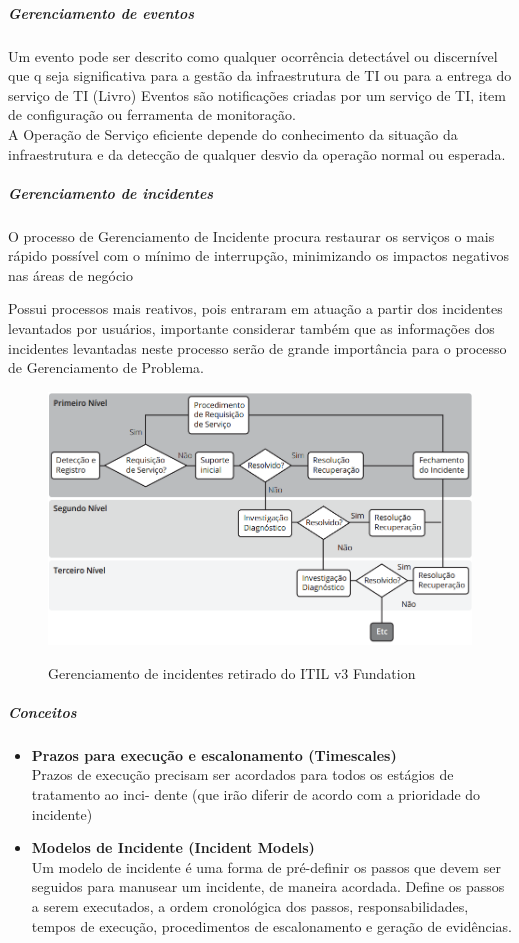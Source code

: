 \subparagraph{Gerenciamento de eventos}
Um evento pode ser descrito como qualquer ocorrência detectável ou discernível que q
seja significativa para a gestão da infraestrutura de TI ou para a entrega do serviço de TI (Livro)
Eventos são notificações criadas por um serviço de TI, item de configuração ou ferramenta
de monitoração.\\ A Operação de Serviço eficiente depende do conhecimento da situação
da infraestrutura e da detecção de qualquer desvio da operação normal ou esperada.


\subparagraph{Gerenciamento de incidentes}
O processo de Gerenciamento de Incidente procura restaurar os serviços o mais rápido
possível com o mínimo de interrupção, minimizando os impactos negativos nas áreas de negócio

Possui processos mais reativos, pois entraram em atuação a partir dos incidentes
levantados por usuários, importante considerar também que as informações dos
incidentes levantadas neste processo serão de grande importância para o processo
de Gerenciamento de Problema.
\\
\begin{figure}[!h]
\caption{Gerenciamento de incidentes retirado do ITIL v3 Fundation}
\centering %
\includegraphics[width=15cm]{itil_images/gerenciamento_de_incidentes.png}
\label{figura:Gerenciamento de incidentes retirado do ITIL v3 Fundation}
\end{figure}

\subparagraph*{Conceitos}
\begin{itemize}[noitemsep]
	\item {\bfseries Prazos para execução e escalonamento (Timescales)} \\
		Prazos de execução precisam ser acordados para todos os estágios de tratamento ao inci-
		dente (que irão diferir de acordo com a prioridade do incidente)

	\item {\bfseries Modelos de Incidente (Incident Models) } \\
		Um modelo de incidente é uma forma de pré-definir os passos que devem ser seguidos
		para manusear um incidente, de maneira acordada. Define os passos a serem executados, a
		ordem cronológica dos passos, responsabilidades, tempos de execução, procedimentos de
		escalonamento e geração de evidências.

\end{itemize}


